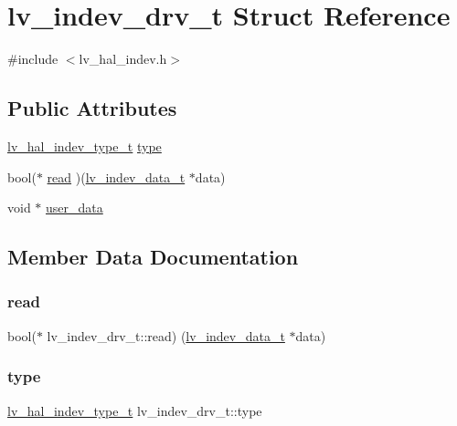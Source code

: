 \hypertarget{structlv__indev__drv__t}{}\section{lv\+\_\+indev\+\_\+drv\+\_\+t Struct Reference}
\label{structlv__indev__drv__t}


{\ttfamily \#include $<$lv\+\_\+hal\+\_\+indev.\+h$>$}

\subsection*{Public Attributes}
\begin{DoxyCompactItemize}
\item 
\mbox{\hyperlink{lv__hal__indev_8h_a30b748dff15060d49ba99560ba012439}{lv\+\_\+hal\+\_\+indev\+\_\+type\+\_\+t}} \mbox{\hyperlink{structlv__indev__drv__t_a405487d17962443b863eb867aede0320}{type}}
\item 
bool($\ast$ \mbox{\hyperlink{structlv__indev__drv__t_a7533fbc36bd2982872e3b6a3ea03a8d0}{read}} )(\mbox{\hyperlink{structlv__indev__data__t}{lv\+\_\+indev\+\_\+data\+\_\+t}} $\ast$data)
\item 
void $\ast$ \mbox{\hyperlink{structlv__indev__drv__t_a3b5aa9a6073246e893bbaf2a46118bff}{user\+\_\+data}}
\end{DoxyCompactItemize}


\subsection{Member Data Documentation}
\mbox{\label{structlv__indev__drv__t_a7533fbc36bd2982872e3b6a3ea03a8d0}} 
\subsubsection{\texorpdfstring{read}{read}}
{\footnotesize\ttfamily bool($\ast$ lv\+\_\+indev\+\_\+drv\+\_\+t\+::read) (\mbox{\hyperlink{structlv__indev__data__t}{lv\+\_\+indev\+\_\+data\+\_\+t}} $\ast$data)}

\mbox{\label{structlv__indev__drv__t_a405487d17962443b863eb867aede0320}} 
\subsubsection{\texorpdfstring{type}{type}}
{\footnotesize\ttfamily \mbox{\hyperlink{lv__hal__indev_8h_a30b748dff15060d49ba99560ba012439}{lv\+\_\+hal\+\_\+indev\+\_\+type\+\_\+t}} lv\+\_\+indev\+\_\+drv\+\_\+t\+::type}

